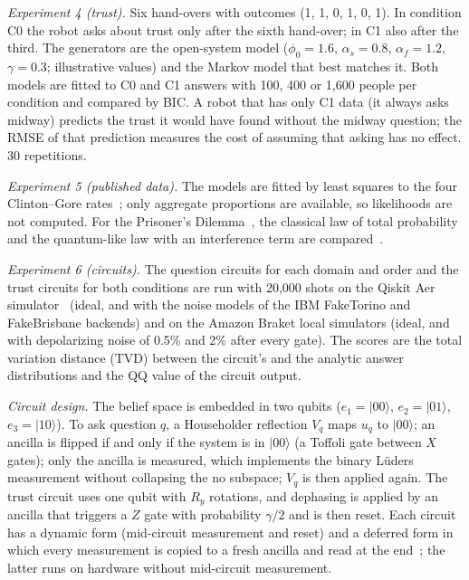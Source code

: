 \textit{Experiment 4 (trust).} Six hand-overs with outcomes (1, 1, 0, 1, 0, 1). In condition C0 the robot asks about trust only after the sixth hand-over; in C1 also after the third. The generators are the open-system model ($\phi_0=1.6$, $\alpha_s=0.8$, $\alpha_f=1.2$, $\gamma=0.3$; illustrative values) and the Markov model that best matches it. Both models are fitted to C0 and C1 answers with 100, 400 or 1,600 people per condition and compared by BIC. A robot that has only C1 data (it always asks midway) predicts the trust it would have found without the midway question; the RMSE of that prediction measures the cost of assuming that asking has no effect. 30 repetitions.

\textit{Experiment 5 (published data).} The models are fitted by least squares to the four Clinton--Gore rates~\cite{Moore2002,Wang2013b}; only aggregate proportions are available, so likelihoods are not computed. For the Prisoner's Dilemma~\cite{Shafir1992}, the classical law of total probability and the quantum-like law with an interference term are compared~\cite{Pothos2009}.

\textit{Experiment 6 (circuits).} The question circuits for each domain and order and the trust circuits for both conditions are run with 20,000 shots on the Qiskit Aer simulator~\cite{JavadiAbhari2024} (ideal, and with the noise models of the IBM FakeTorino and FakeBrisbane backends) and on the Amazon Braket local simulators (ideal, and with depolarizing noise of 0.5\% and 2\% after every gate). The scores are the total variation distance (TVD) between the circuit's and the analytic answer distributions and the QQ value of the circuit output.

\textit{Circuit design.} The belief space is embedded in two qubits ($e_1=|00\rangle$, $e_2=|01\rangle$, $e_3=|10\rangle$). To ask question $q$, a Householder reflection $V_q$ maps $u_q$ to $|00\rangle$; an ancilla is flipped if and only if the system is in $|00\rangle$ (a Toffoli gate between $X$ gates); only the ancilla is measured, which implements the binary L\"uders measurement without collapsing the no subspace; $V_q$ is then applied again. The trust circuit uses one qubit with $R_y$ rotations, and dephasing is applied by an ancilla that triggers a $Z$ gate with probability $\gamma/2$ and is then reset. Each circuit has a dynamic form (mid-circuit measurement and reset) and a deferred form in which every measurement is copied to a fresh ancilla and read at the end~\cite{Nielsen2010}; the latter runs on hardware without mid-circuit measurement.
